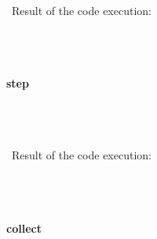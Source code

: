 \documentclass{article}
\begin{document}
\begin{verbatim}

\end{verbatim}


\paragraph{}\
Result of the code execution:

\begin{verbatim} 

\end{verbatim}

\paragraph{}\





\paragraph{ step}\

\begin{verbatim}

\end{verbatim}


\paragraph{}\
Result of the code execution:

\begin{verbatim} 

\end{verbatim}

\paragraph{}\





\paragraph{ collect}\

\begin{verbatim}

\end{verbatim}
\end{document}
